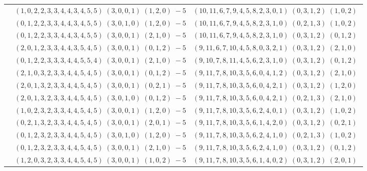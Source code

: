 \documentclass[11pt]{article}
\begin{document}
\begin{longtable}[l]{|c|c|c|}
 \cline{2-3} 
 & $(1 ,0 ,2 ,2 ,3 ,3 ,4 ,4 ,3 ,4 ,5 ,5) \;(3 ,0 ,0 ,1) \;(1 ,2 ,0) \;-5$ & $(10 ,11 ,6 ,7 ,9 ,4 ,5 ,8 ,2 ,3 ,0 ,1) \;(0 ,3 ,1 ,2) \;(1 ,0 ,2) \;$\\ 
 \cline{2-3} 
 & $(0 ,1 ,2 ,2 ,3 ,3 ,4 ,4 ,3 ,4 ,5 ,5) \;(3 ,0 ,1 ,0) \;(1 ,2 ,0) \;-5$ & $(10 ,11 ,6 ,7 ,9 ,4 ,5 ,8 ,2 ,3 ,1 ,0) \;(0 ,2 ,1 ,3) \;(1 ,0 ,2) \;$\\ 
 \cline{2-3} 
 & $(0 ,1 ,2 ,2 ,3 ,3 ,4 ,4 ,3 ,4 ,5 ,5) \;(3 ,0 ,0 ,1) \;(2 ,1 ,0) \;-5$ & $(10 ,11 ,6 ,7 ,9 ,4 ,5 ,8 ,2 ,3 ,1 ,0) \;(0 ,3 ,1 ,2) \;(0 ,1 ,2) \;$\\ 
 \cline{2-3} 
 & $(2 ,0 ,1 ,2 ,3 ,3 ,4 ,4 ,3 ,5 ,4 ,5) \;(3 ,0 ,0 ,1) \;(0 ,1 ,2) \;-5$ & $(9 ,11 ,6 ,7 ,10 ,4 ,5 ,8 ,0 ,3 ,2 ,1) \;(0 ,3 ,1 ,2) \;(2 ,1 ,0) \;$\\ 
 \cline{2-3} 
 & $(0 ,1 ,2 ,2 ,3 ,3 ,3 ,4 ,4 ,5 ,5 ,4) \;(3 ,0 ,0 ,1) \;(2 ,1 ,0) \;-5$ & $(9 ,10 ,7 ,8 ,11 ,4 ,5 ,6 ,2 ,3 ,1 ,0) \;(0 ,3 ,1 ,2) \;(0 ,1 ,2) \;$\\ 
 \cline{2-3} 
 & $(2 ,1 ,0 ,3 ,2 ,3 ,3 ,4 ,4 ,5 ,4 ,5) \;(3 ,0 ,0 ,1) \;(0 ,1 ,2) \;-5$ & $(9 ,11 ,7 ,8 ,10 ,3 ,5 ,6 ,0 ,4 ,1 ,2) \;(0 ,3 ,1 ,2) \;(2 ,1 ,0) \;$\\ 
 \cline{2-3} 
 & $(2 ,0 ,1 ,3 ,2 ,3 ,3 ,4 ,4 ,5 ,4 ,5) \;(3 ,0 ,0 ,1) \;(0 ,2 ,1) \;-5$ & $(9 ,11 ,7 ,8 ,10 ,3 ,5 ,6 ,0 ,4 ,2 ,1) \;(0 ,3 ,1 ,2) \;(1 ,2 ,0) \;$\\ 
 \cline{2-3} 
 & $(2 ,0 ,1 ,3 ,2 ,3 ,3 ,4 ,4 ,5 ,4 ,5) \;(3 ,0 ,1 ,0) \;(0 ,1 ,2) \;-5$ & $(9 ,11 ,7 ,8 ,10 ,3 ,5 ,6 ,0 ,4 ,2 ,1) \;(0 ,2 ,1 ,3) \;(2 ,1 ,0) \;$\\ 
 \cline{2-3} 
 & $(1 ,0 ,2 ,3 ,2 ,3 ,3 ,4 ,4 ,5 ,4 ,5) \;(3 ,0 ,0 ,1) \;(1 ,2 ,0) \;-5$ & $(9 ,11 ,7 ,8 ,10 ,3 ,5 ,6 ,2 ,4 ,0 ,1) \;(0 ,3 ,1 ,2) \;(1 ,0 ,2) \;$\\ 
 \cline{2-3} 
 & $(0 ,2 ,1 ,3 ,2 ,3 ,3 ,4 ,4 ,5 ,4 ,5) \;(3 ,0 ,0 ,1) \;(2 ,0 ,1) \;-5$ & $(9 ,11 ,7 ,8 ,10 ,3 ,5 ,6 ,1 ,4 ,2 ,0) \;(0 ,3 ,1 ,2) \;(0 ,2 ,1) \;$\\ 
 \cline{2-3} 
 & $(0 ,1 ,2 ,3 ,2 ,3 ,3 ,4 ,4 ,5 ,4 ,5) \;(3 ,0 ,1 ,0) \;(1 ,2 ,0) \;-5$ & $(9 ,11 ,7 ,8 ,10 ,3 ,5 ,6 ,2 ,4 ,1 ,0) \;(0 ,2 ,1 ,3) \;(1 ,0 ,2) \;$\\ 
 \cline{2-3} 
 & $(0 ,1 ,2 ,3 ,2 ,3 ,3 ,4 ,4 ,5 ,4 ,5) \;(3 ,0 ,0 ,1) \;(2 ,1 ,0) \;-5$ & $(9 ,11 ,7 ,8 ,10 ,3 ,5 ,6 ,2 ,4 ,1 ,0) \;(0 ,3 ,1 ,2) \;(0 ,1 ,2) \;$\\ 
 \cline{2-3} 
 & $(1 ,2 ,0 ,3 ,2 ,3 ,3 ,4 ,4 ,5 ,4 ,5) \;(3 ,0 ,0 ,1) \;(1 ,0 ,2) \;-5$ & $(9 ,11 ,7 ,8 ,10 ,3 ,5 ,6 ,1 ,4 ,0 ,2) \;(0 ,3 ,1 ,2) \;(2 ,0 ,1) \;$\\ 

\end{longtable}
\end{document}
